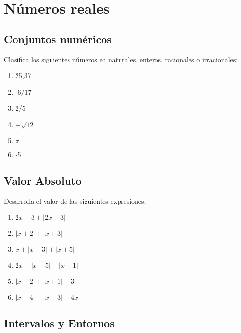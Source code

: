 \chapter{Números reales}
\setcounter{exercicio}{0}

\section{Conjuntos numéricos}

\Exercicio Clasifica los siguientes números en naturales, enteros, racionales o irracionales:

\begin{enumerate}[topsep=0pt]

	\item 25,37

	\item -6/17

	\item 2/5

	\item $-\sqrt{12}$

	\item $ \pi	$

	\item -5

\end{enumerate}


\section{Valor Absoluto}

\Exercicio Desarrolla el valor de las siguientes expresiones:

\begin{enumerate}[topsep=0pt]

	\item $2x - 3 + |2x-3|$

	\item $|x+2| + |x+3|$

	\item $x +|x-3| + |x+5|$
	\item $2x + |x+5| - |x-1|$
	\item $|x-2| + |x+1| - 3$
	\item $|x-4| - |x-3| + 4x$
\end{enumerate}


\section{Intervalos y Entornos}

